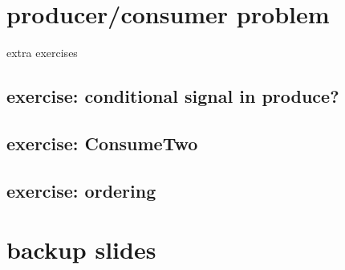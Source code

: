 \documentclass[aspectratio=169]{mytalk}
\title{}
\date{}
\begin{document}





\section{producer/consumer problem}




\begin{frame}{}
\end{frame}
\begin{frame}{extra exercises}
\end{frame}

\subsection{exercise: conditional signal in produce?}


\subsection{exercise: ConsumeTwo}


\subsection{exercise: ordering}


\begin{frame}{}
\end{frame}

\section{backup slides}

%


\end{document}
